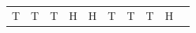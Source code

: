 {{\begin{center}
\begin{tabular}[t]{|l|l|l|l|l|l|l|l|l|l|}
    
        T &
    
    
        T &
    
    
        T &
    
    
        H &
    
    
        H &
    
    
        T &
    
    
        T &
    
    
        T &
    
    
        H &
    
    

\end{tabular}
\end{center}}}
